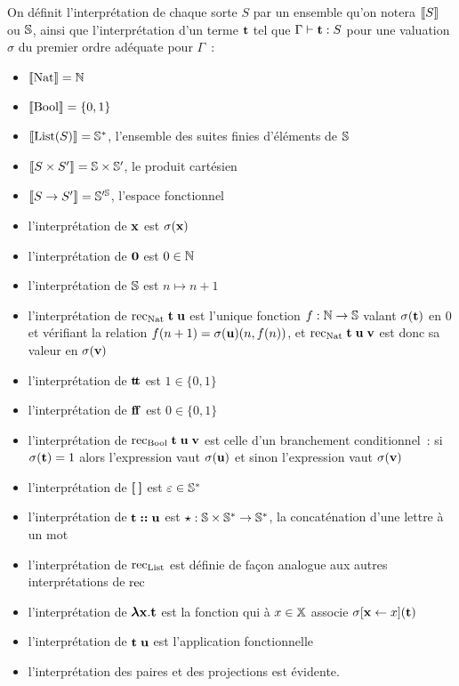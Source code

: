 \documentclass{article}
\begin{document}
On définit l'interprétation de chaque sorte $S$ par un ensemble qu'on notera $\llbracket S \rrbracket$ ou $\mathbb{S}$, ainsi que l'interprétation d'un terme $\mathbf{t}$ tel que $\Gamma\vdash \mathbf{t} : S$ pour une valuation $\sigma$ du premier ordre adéquate pour $\Gamma$~:
\begin{itemize}
    \item $\llbracket \mathrm{Nat} \rrbracket = \mathbb{N}$
    \item $\llbracket \mathrm{Bool} \rrbracket = \{0,1\}$
    \item $\llbracket \mathrm{List}(S) \rrbracket = \mathbb{S}^*$, l'ensemble des suites finies d'éléments de $\mathbb{S}$
    \item $\llbracket S\times S' \rrbracket = \mathbb{S}\times \mathbb{S}'$, le produit cartésien
    \item $\llbracket S\to S' \rrbracket = \mathbb{S}'^{\mathbb{S}}$, l'espace fonctionnel
    \item l'interprétation de $\mathbf{x}$ est $\sigma(\mathbf{x})$
    \item l'interprétation de $\boldsymbol 0$ est $0\in \mathbb{N}$
    \item l'interprétation de $\mathbb{S}$ est $n\mapsto n + 1$
    \item l'interprétation de $\mathrm{rec}_{\mathrm{Nat}}\;\mathbf{t}\;\mathbf{u}$ est l'unique fonction $f : \mathbb{N} \to \mathbb{S}$ valant $\sigma(\mathbf{t})$ en $0$ et vérifiant la relation $f(n+1) = \sigma(\mathbf{u})(n,f(n))$, et $\mathrm{rec}_{\mathrm{Nat}}\;\mathbf{t}\;\mathbf{u}\;\mathbf{v}$ est donc sa valeur en $\sigma(\mathbf{v})$
    \item l'interprétation de $\mathbf{t}\!\mathbf{t}$ est $1\in \{0,1\}$
    \item l'interprétation de $\mathbf{f}\!\mathbf{f}$ est $0\in\{0,1\}$
    \item l'interprétation de $\mathrm{rec}_{\mathrm{Bool}}\;\mathbf{t}\;\mathbf{u}\;\mathbf{v}$ est celle d'un branchement conditionnel~: si $\sigma(\mathbf{t}) = 1$ alors l'expression vaut $\sigma(\mathbf{u})$ et sinon l'expression vaut $\sigma(\mathbf{v})$
    \item l'interprétation de $\boldsymbol{ [ }\:\boldsymbol{ ] }$ est $\varepsilon \in \mathbb{S}^*$
    \item l'interprétation de $\mathbf{t}\boldsymbol{:}\boldsymbol{:}\mathbf{u}$ est $\star : \mathbb{S} \times \mathbb{S}^* \to \mathbb{S}^*$, la concaténation d'une lettre à un mot
    \item l'interprétation de $\mathrm{rec}_{\mathrm{List}}$ est définie de façon analogue aux autres interprétations de $\mathrm{rec}$
    \item l'interprétation de $\boldsymbol{\lambda} \mathbf{x}.\mathbf{t}$ est la fonction qui à $x \in \mathbb X$ associe $\sigma[\mathbf{x}\leftarrow x](\mathbf{t})$
    \item l'interprétation de $\mathbf{t}\;\mathbf{u}$ est l'application fonctionnelle
    \item l'interprétation des paires et des projections est évidente.
\end{itemize}
\end{document}
